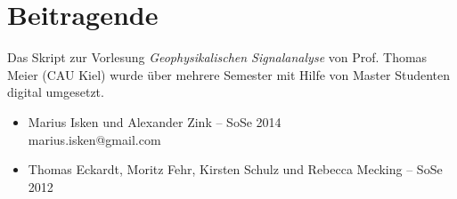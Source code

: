 \documentclass[a4paper, 12pt,openany]{book}  %
\begin{document}

\frontmatter


\setcounter{page}{1}

\tableofcontents                         %

\mainmatter

















\chapter*{Beitragende}
Das Skript zur Vorlesung \textit{Geophysikalischen Signalanalyse} von Prof. Thomas Meier (CAU Kiel) wurde über mehrere Semester mit Hilfe von Master Studenten digital umgesetzt.
\begin{itemize}
\item Marius Isken und Alexander Zink -- SoSe 2014\\
marius.isken@gmail.com
\item Thomas Eckardt, Moritz Fehr, Kirsten Schulz und Rebecca Mecking -- SoSe 2012
\end{itemize}
\end{document}
